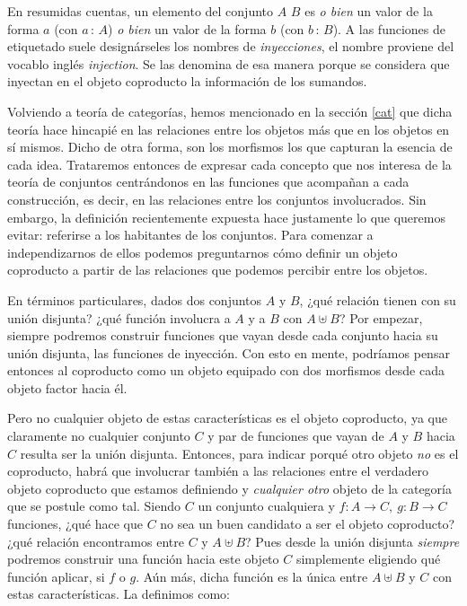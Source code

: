 En resumidas cuentas, un elemento del conjunto $A$ \AgdaFunction{$\uplus$} $B$ es {\it o bien} un valor de la forma  $a$ (con $a\, :\, A$) {\it o bien} un valor de la forma  $b$ (con $b\, :\, B$). 
A las funciones de etiquetado suele designárseles los nombres de {\it inyecciones}, el nombre  proviene del vocablo inglés {\it injection}. Se las denomina de esa manera porque se considera que inyectan en el objeto coproducto la información de los sumandos.

Volviendo a teoría de categorías, hemos mencionado en la sección \ref{cat} que dicha teoría hace hincapié en las relaciones entre los objetos más que en los objetos en sí mismos. Dicho de otra forma, son los morfismos los que capturan la esencia de cada idea. Trataremos entonces de expresar cada concepto que nos interesa de la teoría de conjuntos centrándonos en las funciones que acompañan a cada construcción, es decir, en las relaciones entre los conjuntos involucrados.
Sin embargo, la definición recientemente expuesta hace justamente lo que queremos evitar: referirse a los habitantes de los conjuntos. Para comenzar a independizarnos de ellos podemos preguntarnos cómo definir un objeto coproducto a partir de las relaciones que podemos percibir entre los objetos.

En términos particulares, dados dos conjuntos $A$ y $B$, ¿qué relación tienen con su unión disjunta? ¿qué función involucra a $A$ y a $B$ con $A \uplus B$? 
Por empezar, siempre podremos construir funciones que vayan desde cada conjunto hacia su unión disjunta, las funciones de inyección.  
Con esto en mente, podríamos pensar entonces al coproducto como un objeto equipado con dos morfismos desde cada objeto factor hacia él.

Pero no cualquier objeto de estas características es el objeto coproducto, ya que claramente no cualquier conjunto $C$ y par de funciones que vayan de $A$ y $B$ hacia $C$ resulta ser la unión disjunta. Entonces, para indicar porqué otro objeto {\it no} es el coproducto, habrá que involucrar también a las relaciones entre el verdadero objeto coproducto que estamos definiendo y {\it cualquier otro} objeto de la categoría que se postule como tal. Siendo $C$ un conjunto cualquiera y $f: A \to C,\ g: B \to C $ funciones, ¿qué hace que $C$ no sea un buen candidato a ser el objeto coproducto? ¿qué relación encontramos entre $C$ y $A\uplus B$? Pues desde la unión disjunta {\it siempre} podremos construir una función hacia  este objeto $C$ simplemente eligiendo qué función aplicar, si $f$ o $g$. Aún más, dicha función es la única entre $A\uplus B$ y $C$ con estas características. La definimos como:


